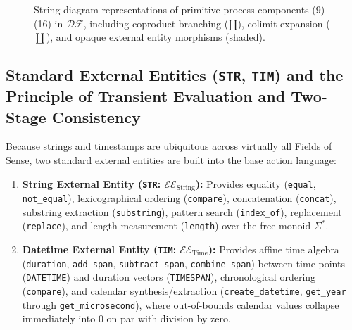 \documentclass[11pt,a4paper]{article}
\theoremstyle{definition}
\theoremstyle{plain}
\theoremstyle{remark}
\newcommand{\DF}{\mathcal{DF}}
\begin{document}
\begin{figure}[htbp]

\caption{String diagram representations of primitive process components (9)--(16) in $\DF$, including coproduct branching ($\amalg$), colimit expansion ($\coprod$), and opaque external entity morphisms (shaded).}
\label{fig:primitives-9-16}
\end{figure}

\subsection{Standard External Entities (\texttt{STR}, \texttt{TIM}) and the Principle of Transient Evaluation and Two-Stage Consistency}
Because strings and timestamps are ubiquitous across virtually all Fields of Sense, two standard external entities are built into the base action language:
\begin{enumerate}
    \item \textbf{String External Entity (\texttt{STR}: $\mathcal{EE}_{\mathrm{String}}$):} Provides equality (\texttt{equal}, \texttt{not\_equal}), lexicographical ordering (\texttt{compare}), concatenation (\texttt{concat}), substring extraction (\texttt{substring}), pattern search (\texttt{index\_of}), replacement (\texttt{replace}), and length measurement (\texttt{length}) over the free monoid $\Sigma^*$.
    \item \textbf{Datetime External Entity (\texttt{TIM}: $\mathcal{EE}_{\mathrm{Time}}$):} Provides affine time algebra (\texttt{duration}, \texttt{add\_span}, \texttt{subtract\_span}, \texttt{combine\_span}) between time points (\texttt{DATETIME}) and duration vectors (\texttt{TIMESPAN}), chronological ordering (\texttt{compare}), and calendar synthesis/extraction (\texttt{create\_datetime}, \texttt{get\_year} through \texttt{get\_microsecond}), where out-of-bounds calendar values collapse immediately into $0$ on par with division by zero.
\end{enumerate}
\end{document}
